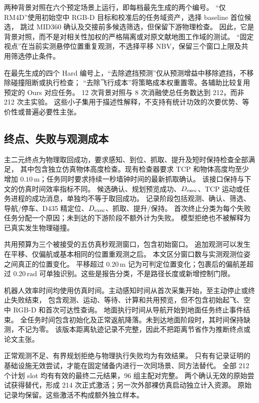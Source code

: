 两种背景对照在六个预定场景上运行，即每档最先生成的两个编号。
“仅 RM4D”使用初始空中 RGB-D 目标和校准后的任务域资产，选择 baseline 首位候选，
跳过 MID360 确认及交接前多候选筛选，但保留下游物理检查。
因此，它是背景对照，而不是对相关性加权的严格隔离或对原文献地图工作域的测试。
“固定视点”在当前实测悬停位置重复观测，不选择平移 NBV，保留三个窗口上限及共用筛选停止条件。

在最先生成的四个 Hard 编号上，“去除遮挡预测”仅从预测增益中移除遮挡，不移除碰撞阻断或执行检查；
“去除飞行成本”将策略成本权重置零。各辅助比较复用预定的 Ours 对应任务。
12 次背景对照与 8 次消融使总任务数达到 212，而非 212 次主实验。
这些小子集用于描述性解释，不支持有统计功效的次要优势、等价性或普遍必要性主张。

\subsection{终点、失败与观测成本}
\label{sec:metrics}
主二元终点为物理取回成功，要求感知、到位、抓取、提升及短时保持检查全部满足，
其中包含独立仿真物体高度检查。现有检查器要求 TCP 和物体高度均至少增加
$0.10\,\mathrm{m}$；任务同时要求持续一秒墙钟时间的最新抓取确认。
该接口保持与下文的仿真时间效率指标不同。
候选确认、规划预览成功、$D_{\mathrm{exec}}$、TCP 运动或任务进程的成功消息，单独均不等于取回成功。
记录阶段包括观测、确认、筛选、导航/停车、D435 精定位、$D_{\mathrm{exec}}$、抓取、提升/保持。
首次终止分类为每个失败任务分配一个原因；未到达的下游阶段不额外计为失败。
模型拒绝也不被解释为已真实发生物理碰撞。

共用预算为三个被接受的五仿真秒观测窗口，包含初始窗口。
追加观测可以发生在平移、仅偏航或基本相同的位置重观测之后。
本文区分窗口数与实测观测位姿之间真正的位置变化。
平移超过 $0.20\,\mathrm{m}$ 记为可判定位置变化；包裹后的偏航差超过
$0.20\,\mathrm{rad}$ 可单独识别。这些是报告分类，不是路径长度或新增控制门限。

机器人效率时间均使用仿真时间。主动感知时间从首次采集开始，至主动停止或终止失败结束，
包含观测、运动、等待、计算和共用预览，但不包含初始起飞、空中 RGB-D 和首次可达性查询。
地面执行时间从导航开始到地面任务终止事件结束。
全任务时间包含初始化及正常返航降落。未到达地面阶段时，其时间保持缺测，不记为零。
该版本距离轨迹记录不完整，因此不把距离节省作为推断终点或论文主张。

正常观测不足、有界规划拒绝与物理执行失败均为有效结果。
只有有记录证明的基础设施无效尝试，才能在固定储备内进行一次同场景、同方法替代。
全部 212 个计划 slot 均有有效的最终二元结果，96 组主配对完整。
两个确认无效的原始尝试获得替代，形成 214 次正式激活；另一次外部裸仿真启动独立计入资源。
原始记录均保留。这些激活不构成额外独立样本。

